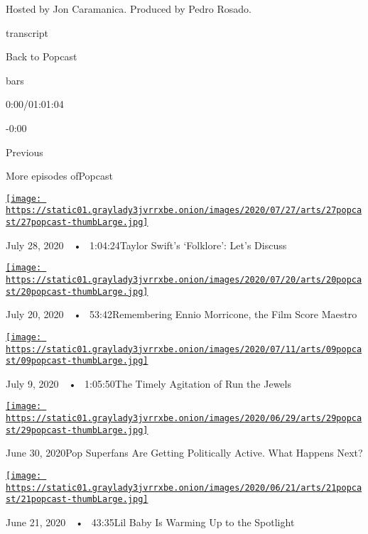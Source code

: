 Hosted by Jon Caramanica. Produced by Pedro Rosado.

transcript

Back to Popcast

bars

0:00/01:01:04

-0:00

Previous

More episodes ofPopcast

\href{https://www.nytimes3xbfgragh.onion/2020/07/27/arts/music/popcast-taylor-swift-folklore.html?action=click\&module=audio-series-bar\&region=header\&pgtype=Article}{\texttt{[image: https://static01.graylady3jvrrxbe.onion/images/2020/07/27/arts/27popcast/27popcast-thumbLarge.jpg]}}

July 28, 2020~~•~ 1:04:24Taylor Swift's `Folklore': Let's Discuss

\href{https://www.nytimes3xbfgragh.onion/2020/07/20/arts/music/popcast-ennio-morricone.html?action=click\&module=audio-series-bar\&region=header\&pgtype=Article}{\texttt{[image: https://static01.graylady3jvrrxbe.onion/images/2020/07/20/arts/20popcast/20popcast-thumbLarge.jpg]}}

July 20, 2020~~•~ 53:42Remembering Ennio Morricone, the Film Score
Maestro

\href{https://www.nytimes3xbfgragh.onion/2020/07/09/arts/music/popcast-run-the-jewels.html?action=click\&module=audio-series-bar\&region=header\&pgtype=Article}{\texttt{[image: https://static01.graylady3jvrrxbe.onion/images/2020/07/11/arts/09popcast/09popcast-thumbLarge.jpg]}}

July 9, 2020~~•~ 1:05:50The Timely Agitation of Run the Jewels

\href{https://www.nytimes3xbfgragh.onion/2020/06/30/arts/music/popcast-superfans-politics.html?action=click\&module=audio-series-bar\&region=header\&pgtype=Article}{\texttt{[image: https://static01.graylady3jvrrxbe.onion/images/2020/06/29/arts/29popcast/29popcast-thumbLarge.jpg]}}

June 30, 2020Pop Superfans Are Getting Politically Active. What Happens
Next?

\href{https://www.nytimes3xbfgragh.onion/2020/06/21/arts/music/popcast-lil-baby.html?action=click\&module=audio-series-bar\&region=header\&pgtype=Article}{\texttt{[image: https://static01.graylady3jvrrxbe.onion/images/2020/06/21/arts/21popcast/21popcast-thumbLarge.jpg]}}

June 21, 2020~~•~ 43:35Lil Baby Is Warming Up to the Spotlight

